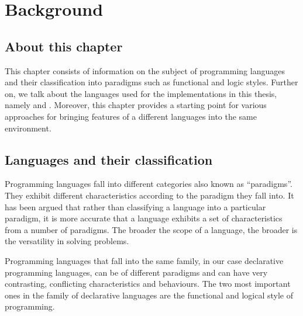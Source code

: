 \documentclass[thesis-solanki.tex]{subfiles}
\begin{document}
\chapter{Background}\label{chap:background}

\section{About this chapter}

This chapter consists of information on the subject of programming languages and their classification into paradigms such as functional and 
logic styles. Further on, we talk about the languages used for the implementations in this thesis, namely  and 
. Moreover, this chapter provides a starting point for various approaches for bringing features of a different languages 
into the same environment.


\section{Languages and their classification}
Programming languages fall into different categories also known as ``paradigms''.
They exhibit different characteristics according to the paradigm they fall into.
It has been argued \cite{Krishnamurthi:2008:TPL:1480828.1480846} that rather than classifying a language into a
particular paradigm, it is more accurate that a language exhibits a set of characteristics from a number of
paradigms.
The broader the scope of a language, the broader is the versatility in solving problems.

Programming languages that fall into the same family, in our case declarative programming languages, can be of
different paradigms and can have very contrasting, conflicting characteristics and behaviours.
The two most important ones in the family of declarative languages are the functional and
logical style of programming.
\end{document}
